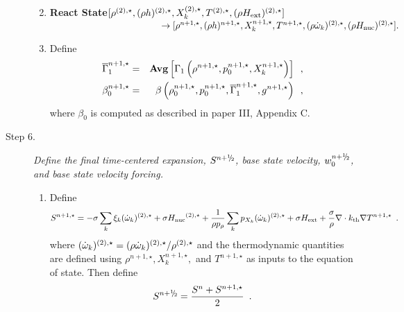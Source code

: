 \begin{description}
\begin{enumerate}
\renewcommand{\theenumi}{{\bf \alph{enumi}}}

\item {\bf React State}$[ \rho^{(2),\star},(\rho h)^{(2),\star}, X_k^{(2),\star}, 
                             T^{(2),\star}, (\rho{H_{\rm ext}})^{(2),\star}] $\\
$~~~~~~~~~~~~~~~~~~~~~~~~~~~~~~~~~~~~~\rightarrow [ \rho^{n+1,\star},(\rho h)^{n+1,\star}, 
X_k^{n+1,\star}, T^{n+1,\star}, (\rho \dot{\omega}_k)^{(2),\star}, (\rho {H_{\rm nuc}})^{(2),\star} ].$  

\item Define
\begin{eqnarray}
 \overline{\Gamma}_1^{n+1,\star}    &=& {\rm{\bf Avg}} \left[ \Gamma_1\left(\rho^{n+1,\star}, p_0^{n+1,\star}, 
                                                      X_k^{n+1,\star}\right) \right] \enskip , \\
 \beta_0^{n+1,\star}    &=& \beta   \left(\rho_0^{n+1,\star}, p_0^{n+1,\star}, \overline{\Gamma}_1^{n+1,\star}, g^{n+1,\star}\right) \enskip ,
\end{eqnarray}
where $\beta_0$ is computed as described in paper III, Appendix C.

\end{enumerate}

\item[Step 6.] {\em Define the final time-centered expansion, $S^{n+\myhalf}$, 
base state velocity, $w_0^{n+\myhalf}$, and base state velocity forcing.}

\begin{enumerate}
\renewcommand{\theenumi}{{\bf \alph{enumi}}}
\item Define
\begin{equation}
  S^{n+1,\star} =  -\sigma  \sum_k  \xi_k  (\dot{\omega}_k)^{(2),\star}  + 
  \sigma {H_{\rm nuc}}^{(2),\star} +
  \frac{1}{\rho p_\rho} \sum_k p_{X_k}  ({\dot{\omega}}_k)^{(2),\star}  
  + \sigma {H_{\rm ext}} + \frac{\sigma}{\rho}\nabla\cdot k_{\rm th}\nabla T^{n+1,\star} \enskip .
\end{equation} 
where $(\dot{\omega}_k)^{(2),\star} = (\rho \dot{\omega}_k)^{(2),\star} / \rho^{(2),\star}$
and the thermodynamic quantities are defined using $\rho^{n+1,\star}, X_k^{n+1,\star},$ 
and $T^{n+1,\star}$ as inputs to the equation of state.
Then define
\begin{equation}
 S^\nph = \frac{S^n + S^{n+1,\star}}{2} \enskip. 
\end{equation}


\end{enumerate}
\end{description}
